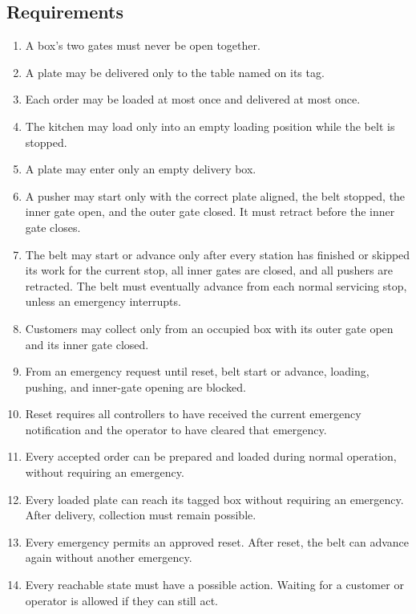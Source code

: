 \documentclass[11pt,a4paper]{article}
\begin{document}
\subsection{Requirements}
\begin{enumerate}[label=\textbf{R\arabic*.},ref=R\arabic*,series=requirements]
  \item \label{req:r1} A box's two gates must never be open together.
  \item \label{req:r2} A plate may be delivered only to the table named on its tag.
  \item \label{req:r3} Each order may be loaded at most once and delivered at most once.
  \item \label{req:r4} The kitchen may load only into an empty loading position while the belt is stopped.
  \item \label{req:r5} A plate may enter only an empty delivery box.
  \item \label{req:r6} A pusher may start only with the correct plate aligned, the belt stopped, the inner gate open, and the outer gate closed. It must retract before the inner gate closes.
  \item \label{req:r7} The belt may start or advance only after every station has finished or skipped its work for the current stop, all inner gates are closed, and all pushers are retracted. The belt must eventually advance from each normal servicing stop, unless an emergency interrupts.
  \item \label{req:r8} Customers may collect only from an occupied box with its outer gate open and its inner gate closed.
  \item \label{req:r9} From an emergency request until reset, belt start or advance, loading, pushing, and inner-gate opening are blocked.
  \item \label{req:r10} Reset requires all controllers to have received the current emergency notification and the operator to have cleared that emergency.
  \item \label{req:r11} Every accepted order can be prepared and loaded during normal operation, without requiring an emergency.
  \item \label{req:r12} Every loaded plate can reach its tagged box without requiring an emergency. After delivery, collection must remain possible.
  \item \label{req:r13} Every emergency permits an approved reset. After reset, the belt can advance again without another emergency.
  \item \label{req:r14} Every reachable state must have a possible action. Waiting for a customer or operator is allowed if they can still act.
\end{enumerate}
\end{document}
